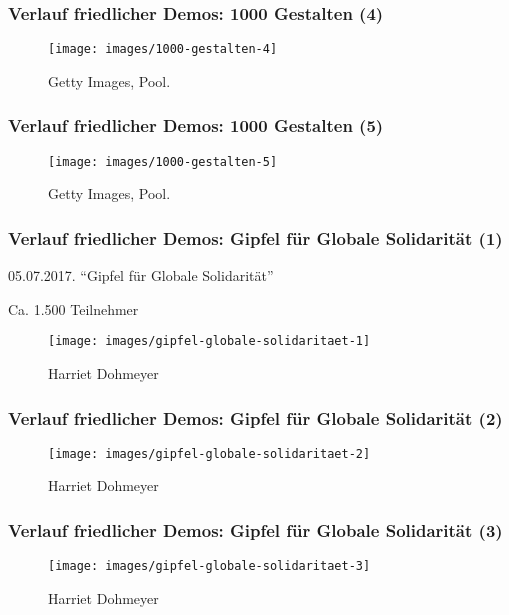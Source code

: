 \documentclass[]{beamer}
\begin{document}
	\begin{frame}
	\frametitle{Verlauf friedlicher Demos: 1000 Gestalten (4)}
	\begin{figure}
		\renewcommand{\figurename}{Foto} 
		\texttt{[image: images/1000-gestalten-4]}
		\caption{Getty Images, Pool.}
	\end{figure}
\end{frame}

	\begin{frame}
	\frametitle{Verlauf friedlicher Demos: 1000 Gestalten (5)}
	\begin{figure}
		\renewcommand{\figurename}{Foto} 
		\texttt{[image: images/1000-gestalten-5]}
		\caption{Getty Images, Pool.}
	\end{figure}
\end{frame}

	\begin{frame}
	\frametitle{Verlauf friedlicher Demos: Gipfel für Globale Solidarität (1)}
		05.07.2017. \enquote{Gipfel für Globale Solidarität}\par
		Ca. 1.500 Teilnehmer
	\begin{figure}
		\renewcommand{\figurename}{Foto} 
		\texttt{[image: images/gipfel-globale-solidaritaet-1]}
		\caption{Harriet Dohmeyer}
	\end{figure}
\end{frame}

	\begin{frame}
	\frametitle{Verlauf friedlicher Demos: Gipfel für Globale Solidarität (2)}
	\begin{figure}
		\renewcommand{\figurename}{Foto} 
		\texttt{[image: images/gipfel-globale-solidaritaet-2]}
		\caption{Harriet Dohmeyer}
	\end{figure}
\end{frame}

	\begin{frame}
	\frametitle{Verlauf friedlicher Demos: Gipfel für Globale Solidarität (3)}
	\begin{figure}
		\renewcommand{\figurename}{Foto} 
		\texttt{[image: images/gipfel-globale-solidaritaet-3]}
		\caption{Harriet Dohmeyer}
	\end{figure}
\end{frame}
\end{document}
